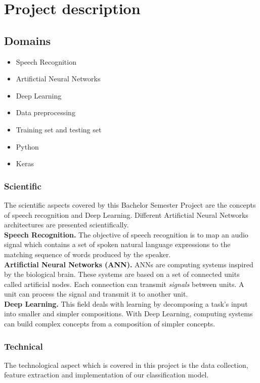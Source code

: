 \section{Project description}
\subsection{Domains}

\begin{itemize}
        \item Speech Recognition
        \item Artifictial Neural Networks
        \item Deep Learning 
        \item Data preprocessing
        \item Training set and testing set
        \item Python
        \item Keras
\end{itemize}

\subsubsection{Scientific}

The scientific aspects covered by this Bachelor Semester Project are the
concepts of speech recognition and Deep Learning. Different Artifictial Neural
Networks architectures are presented scientifically. \\

\textbf{Speech Recognition.} The objective of speech recognition is to map an
audio signal which contains a set of spoken natural language expressions to the
matching sequence of words produced by the speaker.\\

\textbf{Artifictial Neural Networks (ANN).} ANNs are computing systems inspired
by the biological brain. These systems are based on a set of connected units
called artificial nodes. Each connection can transmit \textit{signals} between
units. A unit can process the signal and transmit it to another unit.\\

\textbf{Deep Learning.} This field deals with learning by decomposing a task's
input into smaller and simpler compositions. With Deep Learning, computing
systems can build complex concepts from a composition of simpler concepts.

\subsubsection{Technical} The technological aspect which is covered in this
project is the data collection, feature extraction and implementation of our
classification model. \\

